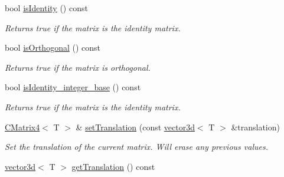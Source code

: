\begin{DoxyCompactItemize}
\mbox{\label{classirr_1_1core_1_1CMatrix4_a01fb063cdc136aaa827c883a3ab6cac4}} 
bool \hyperlink{classirr_1_1core_1_1CMatrix4_a01fb063cdc136aaa827c883a3ab6cac4}{is\+Identity} () const
\begin{DoxyCompactList}\small\item\em Returns true if the matrix is the identity matrix. \end{DoxyCompactList}\item 
\mbox{\label{classirr_1_1core_1_1CMatrix4_a7166c462168855cb8c6aeb2fb76fa3cb}} 
bool \hyperlink{classirr_1_1core_1_1CMatrix4_a7166c462168855cb8c6aeb2fb76fa3cb}{is\+Orthogonal} () const
\begin{DoxyCompactList}\small\item\em Returns true if the matrix is orthogonal. \end{DoxyCompactList}\item 
\mbox{\label{classirr_1_1core_1_1CMatrix4_ad4fc4d401a2b40074b62882873c71e62}} 
bool \hyperlink{classirr_1_1core_1_1CMatrix4_ad4fc4d401a2b40074b62882873c71e62}{is\+Identity\+\_\+integer\+\_\+base} () const
\begin{DoxyCompactList}\small\item\em Returns true if the matrix is the identity matrix. \end{DoxyCompactList}\item 
\mbox{\label{classirr_1_1core_1_1CMatrix4_ac91944a42f1698c7d5c99a16b2e4a36b}} 
\hyperlink{classirr_1_1core_1_1CMatrix4}{C\+Matrix4}$<$ T $>$ \& \hyperlink{classirr_1_1core_1_1CMatrix4_ac91944a42f1698c7d5c99a16b2e4a36b}{set\+Translation} (const \hyperlink{classirr_1_1core_1_1vector3d}{vector3d}$<$ T $>$ \&translation)
\begin{DoxyCompactList}\small\item\em Set the translation of the current matrix. Will erase any previous values. \end{DoxyCompactList}\item 
\mbox{\label{classirr_1_1core_1_1CMatrix4_aa28e4d85af3414c5521cae48d99de887}} 
\hyperlink{classirr_1_1core_1_1vector3d}{vector3d}$<$ T $>$ \hyperlink{classirr_1_1core_1_1CMatrix4_aa28e4d85af3414c5521cae48d99de887}{get\+Translation} () const

\end{DoxyCompactItemize}
